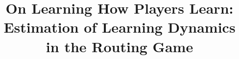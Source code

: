 \documentclass{sig-alternate-ipsn13}
\begin{document}
\title{On Learning How Players Learn:\\
Estimation of Learning Dynamics in the Routing Game
}
%
%
%
%
%
\end{document}
